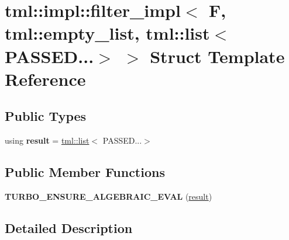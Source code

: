 \hypertarget{structtml_1_1impl_1_1filter__impl_3_01_f_00_01tml_1_1empty__list_00_01tml_1_1list_3_01_p_a_s_s_e_d_8_8_8_4_01_4}{\section{tml\+:\+:impl\+:\+:filter\+\_\+impl$<$ F, tml\+:\+:empty\+\_\+list, tml\+:\+:list$<$ P\+A\+S\+S\+E\+D...$>$ $>$ Struct Template Reference}
\label{structtml_1_1impl_1_1filter__impl_3_01_f_00_01tml_1_1empty__list_00_01tml_1_1list_3_01_p_a_s_s_e_d_8_8_8_4_01_4}
}
\subsection*{Public Types}
\begin{DoxyCompactItemize}
\item 
\hypertarget{structtml_1_1impl_1_1filter__impl_3_01_f_00_01tml_1_1empty__list_00_01tml_1_1list_3_01_p_a_s_s_e_d_8_8_8_4_01_4_a9fe48a1869a8f6b3ced03f4c0140f7e9}{using {\bfseries result} = \hyperlink{structtml_1_1list}{tml\+::list}$<$ P\+A\+S\+S\+E\+D...$>$}\label{structtml_1_1impl_1_1filter__impl_3_01_f_00_01tml_1_1empty__list_00_01tml_1_1list_3_01_p_a_s_s_e_d_8_8_8_4_01_4_a9fe48a1869a8f6b3ced03f4c0140f7e9}

\end{DoxyCompactItemize}
\subsection*{Public Member Functions}
\begin{DoxyCompactItemize}
\item 
\hypertarget{structtml_1_1impl_1_1filter__impl_3_01_f_00_01tml_1_1empty__list_00_01tml_1_1list_3_01_p_a_s_s_e_d_8_8_8_4_01_4_a3954a7f5aaad76bb83fc2ea77401a287}{{\bfseries T\+U\+R\+B\+O\+\_\+\+E\+N\+S\+U\+R\+E\+\_\+\+A\+L\+G\+E\+B\+R\+A\+I\+C\+\_\+\+E\+V\+A\+L} (\hyperlink{structtml_1_1list}{result})}\label{structtml_1_1impl_1_1filter__impl_3_01_f_00_01tml_1_1empty__list_00_01tml_1_1list_3_01_p_a_s_s_e_d_8_8_8_4_01_4_a3954a7f5aaad76bb83fc2ea77401a287}

\end{DoxyCompactItemize}


\subsection{Detailed Description}
